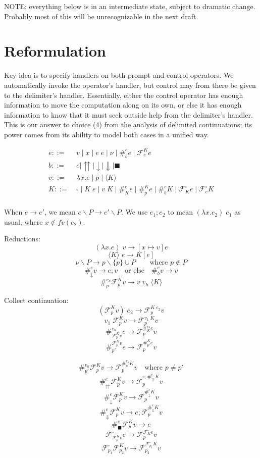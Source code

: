 \documentclass[11pt]{article}
\newcommand\x{\lambda x}
\newcommand\lseq{\mathbin\textrm{\guillemotleft}}
\newcommand\F{\mathcal{F}}
\newcommand{\angles}[1]{\langle#1\rangle}
\begin{document}
NOTE: everything below is in an intermediate state, subject to dramatic change. Probably most of this will be unrecognizable in the next draft.

\section{Reformulation}

Key idea is to specify handlers on both prompt and control operators.
We automatically invoke the operator's handler, but control may from there be given to the delimiter's handler.
Essentially, either the control operator has enough information to move the computation along on its own, or else it has enough information to know that it must seek outside help from the delimiter's handler.
This is our answer to choice (4) from the analysis of delimited continuations; its power comes from its ability to model both cases in a unified way.


\begin{align*}
e ::=&\ v \mid x \mid e\;e \mid \nu \mid \#^e_be \mid \mathcal{F}^K_ee \\
b ::=&\ e \mid {\upuparrows} \mid {\downarrow} \mid {\Downarrow} \mid {\blacksquare} \\
v ::=&\ \x.e \mid p \mid \angles K \\
K ::=&\ \square \mid K\;e \mid v\;K \mid \#_K^ee \mid \#_p^Ke \mid \#_b^eK \mid \F^\square_Ke \mid \F_e^\square K\\
\end{align*}

When $e \to e'$, we mean $e\backslash P \to e' \backslash P$.
We use $e_1; e_2$ to mean $(\x.e_2)\;e_1$ as usual, where $x \notin fv(e_2)$.

Reductions:
$$(\x.e)\;v \to [x \mapsto v]e$$
$$\angles K\;e \to K[e]$$
$$\nu \backslash P \to p \backslash \{p\} \cup P \qquad\textrm{where $p \notin P$}$$
$$\#^e_\downarrow v \to e; v
	\quad\textrm{or else}\quad
  \#^e_bv \to v$$
$$\#_p^{v_h}\F_p^Kv \to v\;v_h\;\angles K$$

Collect continuation:
$$(\F^K_pv)\;e_2 \to \F^{K\;e_2}_pv$$
$$v_1\;\F^K_pv \to \F^{v_1\;K}_pv$$
$$\#_{\F_p^Kv}^{e_h}e \to \F_p^{\#_K^{e_h}e}v$$
$$\#^{\F_p^Kv}_{p'}e \to \F_p^{\#^K_{p'}e}v$$

$$\#_{p'}^{v_h}\F^K_pv \to \F^{\#_{p'}^{v_h}K}_pv
  	\quad\textrm{where }p \neq p'$$
$$\#^e_\upuparrows\F^K_pv \to \F^{e;\#^e_\upuparrows K}_pv$$
$$\#^e_\downarrow \F^K_pv \to \F^{\#^e_\downarrow K}_pv$$
$$\#^e_\Downarrow \F^K_pv \to e;\F^{\#^e_\Downarrow K}_pv$$
$$\#^e_\blacksquare\F^K_pv \to e$$
$$\F^\square_{\F^K_pv}e \to \F^{\F^\square_Ke}_pv$$
$$\F^\square_{p_1}\F^K_{p_2}v \to \F^{\F^\square_{p_1}K}_{p_2}v$$
\end{document}
